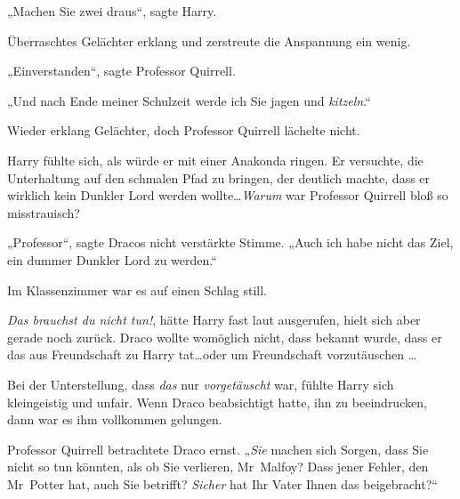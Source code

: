 „Machen Sie zwei draus“, sagte Harry.

Überraschtes Gelächter erklang und zerstreute die Anspannung ein wenig.

„Einverstanden“, sagte Professor Quirrell.

„Und nach Ende meiner Schulzeit werde ich Sie jagen und \emph{kitzeln}.“

Wieder erklang Gelächter, doch Professor Quirrell lächelte nicht.

Harry fühlte sich, als würde er mit einer Anakonda ringen. Er versuchte, die Unterhaltung auf den schmalen Pfad zu bringen, der deutlich machte, dass er wirklich kein Dunkler Lord werden wollte…\emph{Warum} war Professor Quirrell bloß so misstrauisch?

„Professor“, sagte Dracos nicht verstärkte Stimme. „Auch ich habe nicht das Ziel, ein dummer Dunkler Lord zu werden.“

Im Klassenzimmer war es auf einen Schlag still.

\emph{Das brauchst du nicht tun!}, hätte Harry fast laut ausgerufen, hielt sich aber gerade noch zurück. Draco wollte womöglich nicht, dass bekannt wurde, dass er das aus Freundschaft zu Harry tat…oder um Freundschaft vorzutäuschen …

Bei der Unterstellung, dass \emph{das} nur \emph{vorgetäuscht} war, fühlte Harry sich kleingeistig und unfair. Wenn Draco beabsichtigt hatte, ihn zu beeindrucken, dann war es ihm vollkommen gelungen.

Professor Quirrell betrachtete Draco ernst. „\emph{Sie} machen sich Sorgen, dass Sie nicht so tun könnten, als ob Sie verlieren, Mr~Malfoy? Dass jener Fehler, den Mr~Potter hat, auch Sie betrifft? \emph{Sicher} hat Ihr Vater Ihnen das beigebracht?“


